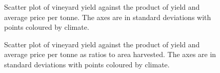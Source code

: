 \documentclass[review,12pt,authoryear]{elsarticle}
\begin{document}
\begin{linenumbers}
\begin{figure}
  \caption{Scatter plot of vineyard yield against the product of yield and average price per tonne. The axes are in standard deviations with points coloured by climate.}\label{fig:yield_vs_value}
\end{figure}
%
\begin{figure}
    \caption{Scatter plot of vineyard yield against the product of yield and average price per tonne as ratios to area harvested. The axes are in standard deviations with points coloured by climate.}\label{fig:yield_vs_value_area}
\end{figure}
%


\end{linenumbers}
\end{document}
